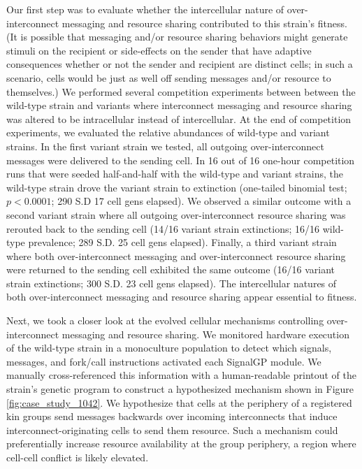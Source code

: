 Our first step was to evaluate whether the intercellular nature of over-interconnect messaging and resource sharing contributed to this strain's fitness.
(It is possible that messaging and/or resource sharing behaviors might generate stimuli on the recipient or side-effects on the sender that have adaptive consequences whether or not the sender and recipient are distinct cells;
in such a scenario, cells would be just as well off sending messages and/or resource to themselves.)
We performed several competition experiments between between the wild-type strain and variants where interconnect messaging and resource sharing was altered to be intracellular instead of intercellular.
At the end of competition experiments, we evaluated the relative abundances of wild-type and variant strains.
In the first variant strain we tested, all outgoing over-interconnect messages were delivered to the sending cell. %
In 16 out of 16 one-hour competition runs that were seeded half-and-half with the wild-type and variant strains, the wild-type strain drove the variant strain to extinction (one-tailed binomial test; $p < 0.0001$; 290 S.D 17 cell gens elapsed).
We observed a similar outcome with a second variant strain where all outgoing over-interconnect resource sharing was rerouted back to the sending cell (14/16 variant strain extinctions; 16/16 wild-type prevalence; 289 S.D. 25 cell gens elapsed).
Finally, a third variant strain where both over-interconnect messaging and over-interconnect resource sharing were returned to the sending cell exhibited the same outcome (16/16 variant strain extinctions; 300 S.D. 23 cell gens elapsed).
The intercellular natures of both over-interconnect messaging and resource sharing appear essential to fitness.

Next, we took a closer look at the evolved cellular mechanisms controlling over-interconnect messaging and resource sharing.
We monitored hardware execution of the wild-type strain in a monoculture population to detect which signals, messages, and fork/call instructions activated each SignalGP module.
We manually cross-referenced this information with a human-readable printout of the strain's genetic program to construct a hypothesized mechanism shown in Figure \ref{fig:case_study_1042}.
We hypothesize that cells at the periphery of a registered kin groups send messages backwards over incoming interconnects that induce interconnect-originating cells to send them resource.
Such a mechanism could preferentially increase resource availability at the group periphery, a region where cell-cell conflict is likely elevated.


